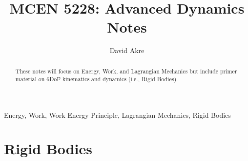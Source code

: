 \documentclass[conference]{IEEEtran}
\begin{document}
\title{MCEN 5228: Advanced Dynamics Notes}

\author{David Akre}

\maketitle

\begin{abstract}
These notes will focus on Energy, Work, and Lagrangian Mechanics but include primer material on 6DoF kinematics and dynamics (i.e., Rigid Bodies).
\end{abstract}

\begin{IEEEkeywords}
    Energy, Work, Work-Energy Principle, Lagrangian Mechanics, Rigid Bodies
\end{IEEEkeywords}

\section{Rigid Bodies}
\end{document}
